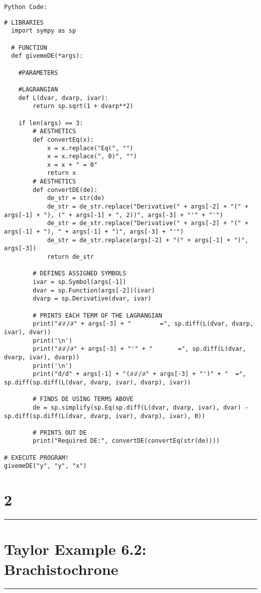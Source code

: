 \documentclass[hidelinks, 11pt]{article}
\begin{document}
  


\begin{lstlisting}[frame = none]
  Python Code:
\end{lstlisting}

\begin{lstlisting}[frame= left]
  # LIBRARIES
  import sympy as sp

  # FUNCTION
  def givemeDE(*args):
    
    #PARAMETERS

    #LAGRANGIAN
    def L(dvar, dvarp, ivar):
        return sp.sqrt(1 + dvarp**2)
    
    if len(args) == 3:
        # AESTHETICS
        def convertEq(x):
            x = x.replace("Eq(", "")
            x = x.replace(", 0)", "")
            x = x + " = 0"
            return x
        # AESTHETICS
        def convertDE(de):
            de_str = str(de)
            de_str = de_str.replace("Derivative(" + args[-2] + "(" + args[-1] + "), (" + args[-1] + ", 2))", args[-3] + "'" + "'")
            de_str = de_str.replace("Derivative(" + args[-2] + "(" + args[-1] + "), " + args[-1] + ")", args[-3] + "'")
            de_str = de_str.replace(args[-2] + "(" + args[-1] + ")", args[-3])
            return de_str

        # DEFINES ASSIGNED SYMBOLS
        ivar = sp.Symbol(args[-1])
        dvar = sp.Function(args[-2])(ivar)
        dvarp = sp.Derivative(dvar, ivar)

        # PRINTS EACH TERM OF THE LAGRANGIAN
        print("∂ℒ/∂" + args[-3] + "        =", sp.diff(L(dvar, dvarp, ivar), dvar))
        print('\n')         
        print("∂ℒ/∂" + args[-3] + "'" + "       =", sp.diff(L(dvar, dvarp, ivar), dvarp))
        print('\n')         
        print("d/d" + args[-1] + "(∂ℒ/∂" + args[-3] + "')" + "  =", sp.diff(sp.diff(L(dvar, dvarp, ivar), dvarp), ivar))

        # FINDS DE USING TERMS ABOVE
        de = sp.simplify(sp.Eq(sp.diff(L(dvar, dvarp, ivar), dvar) - sp.diff(sp.diff(L(dvar, dvarp, ivar), dvarp), ivar), 0))

        # PRINTS OUT DE
        print("Required DE:", convertDE(convertEq(str(de))))

# EXECUTE PROGRAM!
givemeDE("y", "y", "x")
\end{lstlisting}

\begin{center}
  \section*{2}
  \noindent\rule{16cm}{0.4pt}
  \section*{Taylor Example 6.2: Brachistochrone} %
  \noindent\rule{16cm}{0.4pt}
\end{center}
\end{document}
